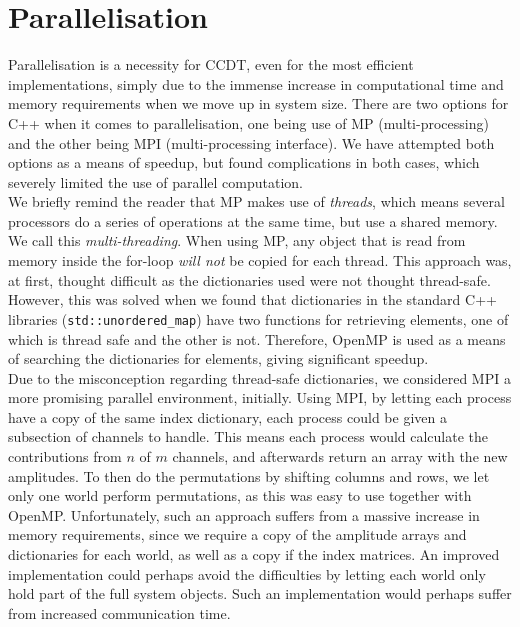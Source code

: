\documentclass[10pt,twoside]{report}
\begin{document}
	\section{Parallelisation}
	Parallelisation is a necessity for CCDT, even for the most efficient implementations, simply due to the immense increase in computational time and memory requirements when we move up in system size. There are two options for C++ when it comes to parallelisation, one being use of MP (multi-processing) and the other being MPI (multi-processing interface). We have attempted both options as a means of speedup, but found complications in both cases, which severely limited the use of parallel computation.\\
	
	We briefly remind the reader that MP makes use of \emph{threads}, which means several processors do a series of operations at the same time, but use a shared memory. We call this \emph{multi-threading}. When using MP, any object that is read from memory inside the for-loop \emph{will not} be copied for each thread. This approach was, at first, thought difficult as the dictionaries used were not thought thread-safe. However, this was solved when we found that dictionaries in the standard C++ libraries (\texttt{std::unordered\_map}) have two functions for retrieving elements, one of which is thread safe and the other is not. Therefore, OpenMP is used as a means of searching the dictionaries for elements, giving significant speedup.\\
	
	Due to the misconception regarding thread-safe dictionaries, we considered MPI a more promising parallel environment, initially. Using MPI, by letting each process have a copy of the same index dictionary, each process could be given a subsection of channels to handle. This means each process would calculate the contributions from $n$ of $m$ channels, and afterwards return an array with the new amplitudes. To then do the permutations by shifting columns and rows, we let only one world perform permutations, as this was easy to use together with OpenMP. Unfortunately, such an approach suffers from a massive increase in memory requirements, since we require a copy of the amplitude arrays and dictionaries for each world, as well as a copy if the index matrices. An improved implementation could perhaps avoid the difficulties by letting each world only hold part of the full system objects. Such an implementation would perhaps suffer from increased communication time.\\
	
\end{document}
